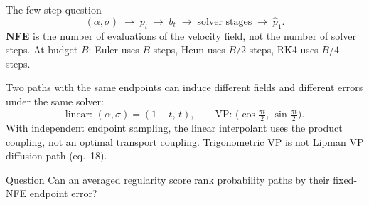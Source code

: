 \documentclass[aspectratio=169,10pt,c]{beamer}
\newcommand{\citefoot}[1]{{\tiny\color{fsgray}\citep{#1}}}
\begin{document}
\begin{frame}{The few-step question}
  \small
  \[
    (\alpha,\sigma)
    \;\longrightarrow\;
    p_t
    \;\longrightarrow\;
    b_t
    \;\longrightarrow\;
    \text{solver stages}
    \;\longrightarrow\;
    \widehat p_1.
  \]
  \textbf{NFE} is the number of evaluations of the velocity field, not the
  number of solver steps. At budget \(B\): Euler uses \(B\) steps, Heun uses
  \(B/2\) steps, RK4 uses \(B/4\) steps.

  Two paths with the same endpoints can induce different fields and different
  errors under the same solver:
  \[
    \text{linear: }(\alpha,\sigma)=(1-t,\,t),
    \qquad
    \text{VP: }\bigl(\cos\tfrac{\pi t}{2},\,\sin\tfrac{\pi t}{2}\bigr).
  \]
  With independent endpoint sampling, the linear interpolant uses the product
  coupling, not an optimal transport coupling.
  Trigonometric VP is not Lipman VP diffusion path (eq.~18).

  \begin{block}{Question}
    Can an averaged regularity score rank probability paths by their
    fixed-NFE endpoint error?
  \end{block}
  \citefoot{lipman2023flow,albergo2025stochastic,liu2023rectified,lipschitzguided2025,sabour2024align}
\end{frame}
\end{document}
